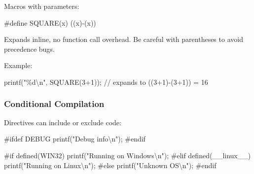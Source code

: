 \documentclass[
  letterpaper,
  DIV=11,
  numbers=noendperiod]{scrreprt}
\newenvironment{Shaded}{\begin{snugshade}}{\end{snugshade}}
\newcommand{\CommentTok}[1]{\textcolor[rgb]{0.37,0.37,0.37}{#1}}
\newcommand{\DecValTok}[1]{\textcolor[rgb]{0.68,0.00,0.00}{#1}}
\newcommand{\NormalTok}[1]{\textcolor[rgb]{0.00,0.23,0.31}{#1}}
\newcommand{\OperatorTok}[1]{\textcolor[rgb]{0.37,0.37,0.37}{#1}}
\newcommand{\PreprocessorTok}[1]{\textcolor[rgb]{0.68,0.00,0.00}{#1}}
\newcommand{\SpecialCharTok}[1]{\textcolor[rgb]{0.37,0.37,0.37}{#1}}
\newcommand{\StringTok}[1]{\textcolor[rgb]{0.13,0.47,0.30}{#1}}
\begin{document}
Macros with parameters:

\begin{Shaded}
\begin{Highlighting}[]
\PreprocessorTok{\#define SQUARE}\OperatorTok{(}\PreprocessorTok{x}\OperatorTok{)}\PreprocessorTok{ }\OperatorTok{((}\PreprocessorTok{x}\OperatorTok{){-}(}\PreprocessorTok{x}\OperatorTok{))}
\end{Highlighting}
\end{Shaded}

Expands inline, no function call overhead. Be careful with parentheses
to avoid precedence bugs.

Example:

\begin{Shaded}
\begin{Highlighting}[]
\NormalTok{printf}\OperatorTok{(}\StringTok{"}\SpecialCharTok{\%d\textbackslash{}n}\StringTok{"}\OperatorTok{,}\NormalTok{ SQUARE}\OperatorTok{(}\DecValTok{3}\OperatorTok{+}\DecValTok{1}\OperatorTok{));}  \CommentTok{// expands to ((3+1){-}(3+1)) = 16}
\end{Highlighting}
\end{Shaded}

\subsubsection{Conditional Compilation}\label{conditional-compilation}

Directives can include or exclude code:

\begin{Shaded}
\begin{Highlighting}[]
\PreprocessorTok{\#ifdef DEBUG}
\NormalTok{    printf}\OperatorTok{(}\StringTok{"Debug info}\SpecialCharTok{\textbackslash{}n}\StringTok{"}\OperatorTok{);}
\PreprocessorTok{\#endif}
\end{Highlighting}
\end{Shaded}

\begin{Shaded}
\begin{Highlighting}[]
\PreprocessorTok{\#if defined(WIN32)}
\NormalTok{    printf}\OperatorTok{(}\StringTok{"Running on Windows}\SpecialCharTok{\textbackslash{}n}\StringTok{"}\OperatorTok{);}
\PreprocessorTok{\#elif defined(\_\_linux\_\_)}
\NormalTok{    printf}\OperatorTok{(}\StringTok{"Running on Linux}\SpecialCharTok{\textbackslash{}n}\StringTok{"}\OperatorTok{);}
\PreprocessorTok{\#else}
\NormalTok{    printf}\OperatorTok{(}\StringTok{"Unknown OS}\SpecialCharTok{\textbackslash{}n}\StringTok{"}\OperatorTok{);}
\PreprocessorTok{\#endif}
\end{Highlighting}
\end{Shaded}
\end{document}
